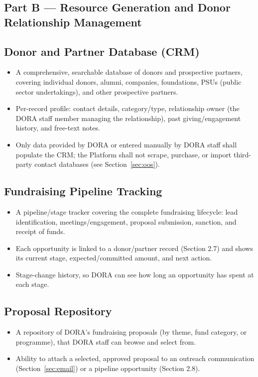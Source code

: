 \documentclass[11pt]{article}
\begin{document}
\subsection*{Part B --- Resource Generation and Donor Relationship Management}

\subsection{Donor and Partner Database (CRM)}
\begin{itemize}[leftmargin=1.4em, itemsep=3pt]
\item A comprehensive, searchable database of donors and prospective partners, covering individual donors, alumni, companies, foundations, PSUs (public sector undertakings), and other prospective partners.
\item Per-record profile: contact details, category/type, relationship owner (the DORA staff member managing the relationship), past giving/engagement history, and free-text notes.
\item Only data provided by DORA or entered manually by DORA staff shall populate the CRM; the Platform shall not scrape, purchase, or import third-party contact databases (see Section~\ref{sec:oos}).
\end{itemize}

\subsection{Fundraising Pipeline Tracking}
\begin{itemize}[leftmargin=1.4em, itemsep=3pt]
\item A pipeline/stage tracker covering the complete fundraising lifecycle: lead identification, meetings/engagement, proposal submission, sanction, and receipt of funds.
\item Each opportunity is linked to a donor/partner record (Section 2.7) and shows its current stage, expected/committed amount, and next action.
\item Stage-change history, so DORA can see how long an opportunity has spent at each stage.
\end{itemize}

\subsection{Proposal Repository}
\begin{itemize}[leftmargin=1.4em, itemsep=3pt]
\item A repository of DORA's fundraising proposals (by theme, fund category, or programme), that DORA staff can browse and select from.
\item Ability to attach a selected, approved proposal to an outreach communication (Section~\ref{sec:email}) or a pipeline opportunity (Section 2.8).
\end{itemize}
\end{document}
